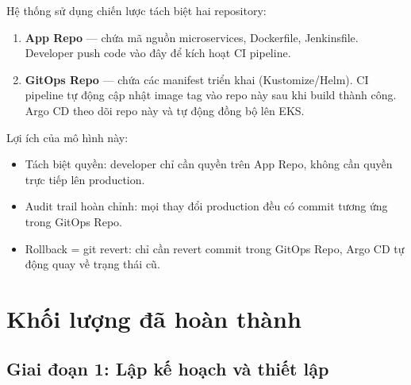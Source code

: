 \documentclass[12pt,a4paper]{article}
\begin{document}
Hệ thống sử dụng chiến lược tách biệt hai repository:

\begin{enumerate}[leftmargin=*,nosep]
  \item \textbf{App Repo} — chứa mã nguồn microservices, Dockerfile, Jenkinsfile. Developer push code vào đây để kích hoạt CI pipeline.
  \item \textbf{GitOps Repo} — chứa các manifest triển khai (Kustomize/Helm). CI pipeline tự động cập nhật image tag vào repo này sau khi build thành công. Argo CD theo dõi repo này và tự động đồng bộ lên EKS.
\end{enumerate}

Lợi ích của mô hình này:
\begin{itemize}[leftmargin=*,nosep]
  \item Tách biệt quyền: developer chỉ cần quyền trên App Repo, không cần quyền trực tiếp lên production.
  \item Audit trail hoàn chỉnh: mọi thay đổi production đều có commit tương ứng trong GitOps Repo.
  \item Rollback = git revert: chỉ cần revert commit trong GitOps Repo, Argo CD tự động quay về trạng thái cũ.
\end{itemize}

\section{Khối lượng đã hoàn thành}

\subsection{Giai đoạn 1: Lập kế hoạch và thiết lập}
\end{document}
